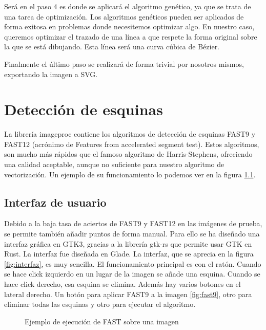 \documentclass{report}
\begin{document}
Será en el paso 4 es donde se aplicará el algoritmo genético, ya que se trata de una tarea de 
optimización. Los algoritmos genéticos pueden ser aplicados de forma exitosa en problemas donde 
necesitemos optimizar algo. En nuestro caso, queremos optimizar el trazado de una línea a que 
respete la forma original sobre la que se está dibujando. Esta línea será una curva cúbica de Bézier.

Finalmente el último paso se realizará de forma trivial por nosotros mismos, 
exportando la imagen a SVG.

\chapter{Detección de esquinas}
La librería imageproc contiene los algoritmos de detección de esquinas
FAST9 y FAST12 \cite{rosten_2006_machine} (acrónimo de Features from accelerated segment test). 
Estos algoritmos, son mucho más rápidos que el
 famoso algoritmo de Harris-Stephens, ofreciendo una calidad aceptable, aunque no suficiente para 
 nuestro algoritmo de vectorización. Un ejemplo de su funcionamiento lo podemos ver en la 
 figura \ref{fig:fast-png}.


\section{Interfaz de usuario}

Debido a la baja tasa de aciertos de FAST9 y FAST12 en las imágenes de prueba, se permite también
añadir puntos de forma manual. Para ello se ha diseñado una interfaz gráfica en GTK3, gracias a
la librería gtk-rs que permite usar GTK en Rust. La interfaz fue diseñada en Glade. La interfaz, 
que se aprecia en la figura \ref{fig:interfaz}, 
es muy sencilla. El funcionamiento principal es con el ratón. Cuando se hace click izquierdo en un
lugar de la imagen se añade una esquina. Cuando se hace click derecho, esa esquina se elimina. 
Además hay varios botones en el lateral derecho. Un botón para aplicar FAST9 a la imagen \ref{fig:fast9}, otro para eliminar 
todas las esquinas y otro para ejecutar el algoritmo.

\begin{figure}
	\caption{\label{fig:fast-png} Ejemplo de ejecución de FAST sobre una imagen}
\end{figure}
\end{document}
